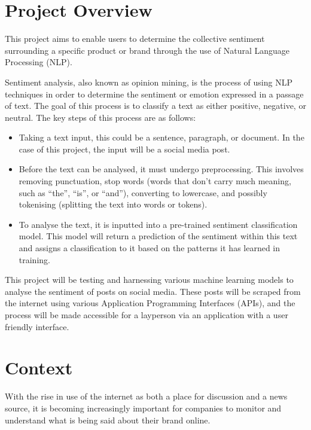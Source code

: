 \section{Project Overview}
This project aims to enable users to determine the collective sentiment surrounding a specific product or brand through the use of Natural Language Processing (NLP).

Sentiment analysis, also known as opinion mining, is the process of using NLP techniques in order to determine the sentiment or emotion expressed in a passage of text. The goal of this process is to classify a text as either positive, negative, or neutral. The key steps of this process are as follows:
\begin{itemize}
    \item Taking a text input, this could be a sentence, paragraph, or document. In the case of this project, the input will be a social media post.
    \item Before the text can be analysed, it must undergo preprocessing. This involves removing punctuation, stop words (words that don't carry much meaning, such as ``the'', ``is'', or ``and''), converting to lowercase, and possibly tokenising (splitting the text into words or tokens).
    \item To analyse the text, it is inputted into a pre-trained sentiment classification model. This model will return a prediction of the sentiment within this text and assigns a classification to it based on the patterns it has learned in training.
\end{itemize}

This project will be testing and harnessing various machine learning models to analyse the sentiment of posts on social media. These posts will be scraped from the internet using various Application Programming Interfaces (APIs), and the process will be made accessible for a layperson via an application with a user friendly interface.

\section{Context}
With the rise in use of the internet as both a place for discussion and a news source, it is becoming increasingly important for companies to monitor and understand what is being said about their brand online.

